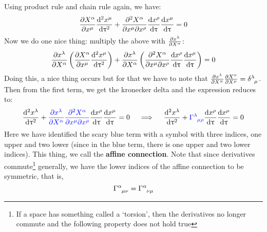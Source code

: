 Using product rule and chain rule again, we have:
$$\pdv{X^\alpha}{x^\mu}\dv[2]{x^\mu}{\uptau} +\pdv{X^\alpha}{x^\mu}{x^\rho} \dv{x^\rho}{\uptau} \dv{x^\mu}{\uptau}=0$$
Now we do one nice thing: multiply the above with $\pdv{x^\lambda}{X^\alpha}$:
$$\pdv{x^\lambda}{X^\alpha}\left( \pdv{X^\alpha}{x^\mu}\dv[2]{x^\mu}{\uptau} \right) +\pdv{x^\lambda}{X^\alpha}\left( \pdv{X^\alpha}{x^\mu}{x^\rho} \dv{x^\rho}{\uptau} \dv{x^\mu}{\uptau} \right)=0$$
Doing this, a nice thing occurs but for that we have to note that $\pdv{x^\lambda}{X^\alpha}\pdv{X^\alpha}{X^\mu} = \tensor{\delta}{^\lambda _\mu}$. Then from the first term, we get the kronecker delta and the expression reduces to:
$$\dv[2]{x^\lambda}{\uptau} +\mathcolor{blue}{\pdv{x^\lambda}{X^\alpha}\pdv{X^\alpha}{x^\mu}{x^\rho}} \dv{x^\rho}{\uptau} \dv{x^\mu}{\uptau}=0 \quad \implies \quad \dv[2]{x^\lambda}{\uptau} +\mathcolor{blue}{\tensor{\Gamma}{^\lambda _\mu _\rho}} \dv{x^\rho}{\uptau} \dv{x^\mu}{\uptau}=0$$
Here we have identified the scary blue term with a symbol with three indices, one upper and two lower (since in the blue term, there is one upper and two lower indices). This thing, we call the \textbf{affine connection}. 
Note that since derivatives commute\footnote{If a space has something called a `torsion', then the derivatives no longer commute and the following property does not hold true} generally, we have the lower indices of the affine connection to be symmetric, that is,
$$\tensor{\Gamma}{^\alpha _\mu _\nu} =\tensor{\Gamma}{^\alpha _\nu _\mu}$$
